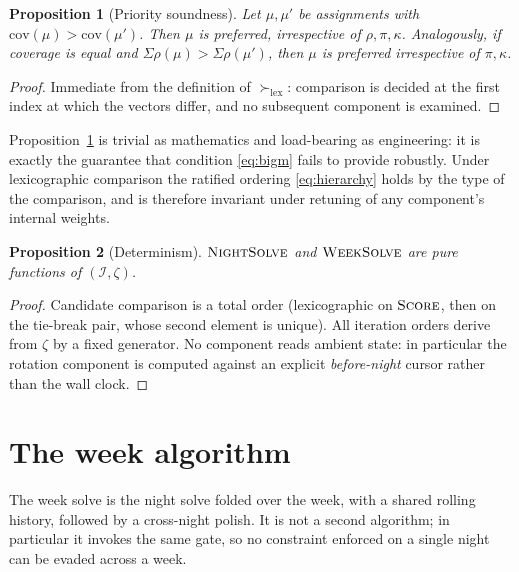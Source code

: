 \documentclass[11pt,a4paper]{article}
\newtheorem{proposition}{Proposition}
\theoremstyle{definition}
\theoremstyle{remark}
\newcommand{\score}{\textsc{Score}}
\newcommand{\nightsolve}{\textsc{NightSolve}}
\newcommand{\weeksolve}{\textsc{WeekSolve}}
\newcommand{\lex}{\succ_{\mathrm{lex}}}
\begin{document}
\begin{proposition}[Priority soundness]
\label{prop:lex}
Let $\mu, \mu'$ be assignments with $\mathrm{cov}(\mu) >
\mathrm{cov}(\mu')$. Then $\mu$ is preferred, irrespective of $\rho, \pi,
\kappa$. Analogously, if coverage is equal and $\Sigma\rho(\mu) >
\Sigma\rho(\mu')$, then $\mu$ is preferred irrespective of $\pi, \kappa$.
\end{proposition}

\begin{proof}
Immediate from the definition of $\lex$: comparison is decided at the first
index at which the vectors differ, and no subsequent component is examined.
\end{proof}

Proposition~\ref{prop:lex} is trivial as mathematics and load-bearing as
engineering: it is exactly the guarantee that condition \eqref{eq:bigm}
fails to provide robustly. Under lexicographic comparison the ratified
ordering \eqref{eq:hierarchy} holds by the type of the comparison, and is
therefore invariant under retuning of any component's internal weights.

\begin{proposition}[Determinism]
$\nightsolve$ and $\weeksolve$ are pure functions of
$(\mathcal{I}, \zeta)$.
\end{proposition}

\begin{proof}
Candidate comparison is a total order (lexicographic on $\score$, then on
the tie-break pair, whose second element is unique). All iteration orders
derive from $\zeta$ by a fixed generator. No component reads ambient state:
in particular the rotation component is computed against an explicit
\textit{before-night} cursor rather than the wall clock.
\end{proof}

\section{The week algorithm}
\label{sec:week}

The week solve is the night solve folded over the week, with a shared
rolling history, followed by a cross-night polish. It is not a second
algorithm; in particular it invokes the same gate, so no constraint enforced
on a single night can be evaded across a week.
\end{document}
